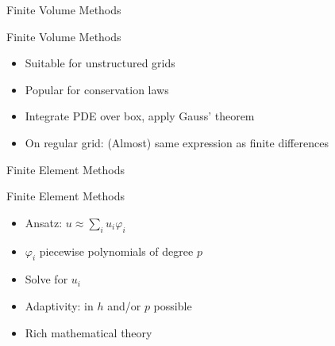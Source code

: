 
\begin{frame}{Finite Volume Methods}
 
 \begin{block}{Finite Volume Methods}
   \begin{itemize}
    \item Suitable for unstructured grids
    \item Popular for conservation laws
    \item Integrate PDE over box, apply Gauss' theorem
    \item On regular grid: (Almost) same expression as finite differences
   \end{itemize}
 \end{block}
 
 
\end{frame}






\begin{frame}{Finite Element Methods}
 
 \begin{block}{Finite Element Methods}
   \begin{itemize}
    \item Ansatz: $u \approx \sum_i u_i \varphi_i$
    \item $\varphi_i$ piecewise polynomials of degree $p$
    \item Solve for $u_i$
    \item Adaptivity: in $h$ and/or $p$ possible
    \item Rich mathematical theory
   \end{itemize}
 \end{block}
 
 
\end{frame}

